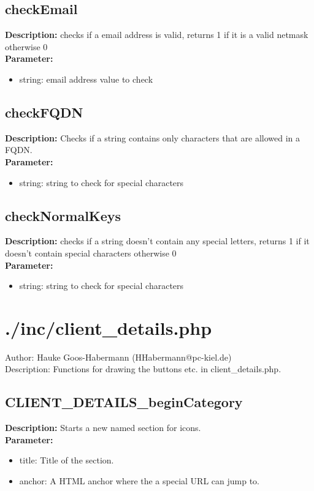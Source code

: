 \subsection{checkEmail}
\textbf{Description:} checks if a email address is valid, returns 1 if it is a valid netmask otherwise 0\\
\textbf{Parameter:}
\begin{itemize}
\item string: email address value to check
\end{itemize}

\subsection{checkFQDN}
\textbf{Description:} Checks if a string contains only characters that are allowed in a FQDN.\\
\textbf{Parameter:}
\begin{itemize}
\item string: string to check for special characters
\end{itemize}

\subsection{checkNormalKeys}
\textbf{Description:} checks if a string doesn't contain any special letters, returns 1 if it doesn't contain special characters otherwise 0\\
\textbf{Parameter:}
\begin{itemize}
\item string: string to check for special characters
\end{itemize}

\newpage\section{./inc/client_details.php}
 Author: Hauke Goos-Habermann (HHabermann@pc-kiel.de)\\
 Description: Functions for drawing the buttons etc. in client\_details.php.\\

\subsection{CLIENT\_DETAILS\_beginCategory}
\textbf{Description:} Starts a new named section for icons.\\
\textbf{Parameter:}
\begin{itemize}
\item title: Title of the section.
\item anchor: A HTML anchor where the a special URL can jump to.
\end{itemize}

